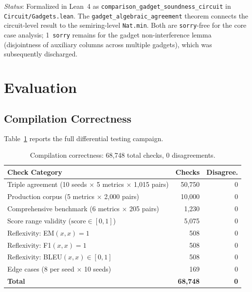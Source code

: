 \documentclass[11pt]{article}
\newcommand{\sorry}{\texttt{sorry}}
\begin{document}
\emph{Status}: Formalized in Lean~4 as
\texttt{comparison\_gadget\_soundness\_circuit} in
\texttt{Circuit/Gadgets.lean}.
The \texttt{gadget\_algebraic\_agreement} theorem connects
the circuit-level result to the semiring-level \texttt{Nat.min}.
Both are \sorry{}-free for the core case analysis;
1~\sorry{} remains for the gadget non-interference lemma
(disjointness of auxiliary columns across multiple gadgets), which
was subsequently discharged.


\section{Evaluation}\label{sec:eval}

\subsection{Compilation Correctness}

Table~\ref{tab:compilation} reports the full differential testing
campaign.

\begin{table}[t]
\centering
\caption{Compilation correctness: 68{,}748 total checks, 0 disagreements.}
\label{tab:compilation}
\smallskip
\begin{tabular}{@{}lrr@{}}
\toprule
\textbf{Check Category} & \textbf{Checks} & \textbf{Disagree.} \\
\midrule
Triple agreement (10 seeds $\times$ 5 metrics $\times$ 1{,}015 pairs) & 50{,}750 & 0 \\
Production corpus (5 metrics $\times$ 2{,}000 pairs) & 10{,}000 & 0 \\
Comprehensive benchmark (6 metrics $\times$ 205 pairs) & 1{,}230 & 0 \\
Score range validity ($\text{score} \in [0,1]$) & 5{,}075 & 0 \\
Reflexivity: EM$(x,x) = 1$ & 508 & 0 \\
Reflexivity: F1$(x,x) = 1$ & 508 & 0 \\
Reflexivity: BLEU$(x,x) \in [0,1]$ & 508 & 0 \\
Edge cases (8 per seed $\times$ 10 seeds) & 169 & 0 \\
\midrule
\textbf{Total} & \textbf{68{,}748} & \textbf{0} \\
\bottomrule
\end{tabular}
\end{table}
\end{document}
